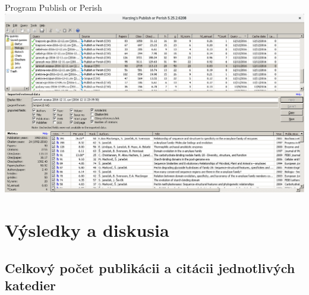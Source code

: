 \documentclass{beamer}
\begin{document}
%
%
\begin{frame}{Program Publish or Perish}
  \includegraphics[scale=0.255]{publish-or-perish_wine.png} \\[-1ex]
  \parbox{\textwidth}{\centering\tiny \citet{Harzing2011}}
\end{frame}



%
%



\section{Výsledky a diskusia}

\subsection{Celkový počet publikácii a citácii jednotlivých katedier}
\end{document}
